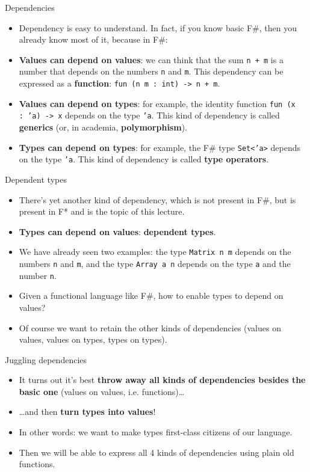 \documentclass{beamer}
\newcommand{\m}[1]{\texttt{#1}}
\begin{document}
\begin{frame}{Dependencies}
\begin{itemize}
	\item Dependency is easy to understand. In fact, if you know basic F\#, then you already know most of it, because in F\#:
	\item \textbf{Values can depend on values}: we can think that the sum \m{n + m} is a number that depends on the numbers \m{n} and \m{m}. This dependency can be expressed as a \textbf{function}: \m{fun (n m :\ int) -> n + m}.
	\item \textbf{Values can depend on types}: for example, the identity function \m{fun (x :\ 'a) -> x} depends on the type \m{'a}. This kind of dependency is called \textbf{generics} (or, in academia, \textbf{polymorphism}).
	\item \textbf{Types can depend on types}: for example, the F\# type \m{Set<'a>} depends on the type \m{'a}. This kind of dependency is called \textbf{type operators}.
\end{itemize}
\end{frame}

\begin{frame}{Dependent types}
\begin{itemize}
	\item There's yet another kind of dependency, which is not present in F\#, but is present in F* and is the topic of this lecture.
	\item \textbf{Types can depend on values}: \textbf{dependent types}.
	\item We have already seen two examples: the type \m{Matrix n m} depends on the numbers \m{n} and \m{m}, and the type \m{Array a n} depends on the type \m{a} and the number \m{n}.
	\item Given a functional language like F\#, how to enable types to depend on values?
	\item Of course we want to retain the other kinds of dependencies (values on values, values on types, types on types).
\end{itemize}
\end{frame}

\begin{frame}{Juggling dependencies}
\begin{itemize}
	\item It turns out it's best \textbf{throw away all kinds of dependencies besides the basic one} (values on values, i.e. functions)\dots
	\item \dots and then \textbf{turn types into values}!
	\item In other words: we want to make types first-class citizens of our language.
	\item Then we will be able to express all 4 kinds of dependencies using plain old functions.
\end{itemize}
\end{frame}
\end{document}
